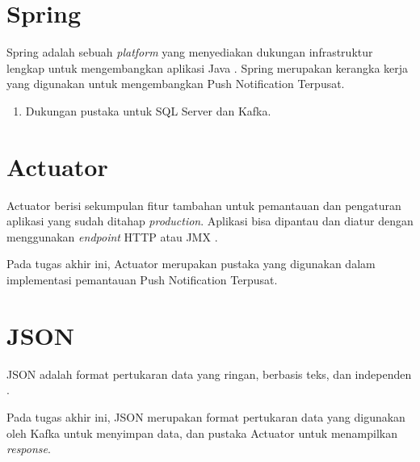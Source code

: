 \section{Spring}
\par Spring adalah sebuah \textit{platform} yang menyediakan dukungan infrastruktur lengkap untuk mengembangkan aplikasi Java \cite{spring-online}. Spring merupakan kerangka kerja yang digunakan untuk mengembangkan Push Notification Terpusat.
\begin{enumerate}
	\item Dukungan pustaka untuk SQL Server dan Kafka.
\end{enumerate}

\section{Actuator}
\par Actuator berisi sekumpulan fitur tambahan untuk pemantauan dan pengaturan aplikasi yang sudah ditahap \textit{production}. Aplikasi bisa dipantau dan diatur dengan menggunakan \textit{endpoint} HTTP atau JMX \cite{actuator-online}.
\par Pada tugas akhir ini, Actuator merupakan pustaka yang digunakan dalam implementasi pemantauan Push Notification Terpusat.

\section{JSON}
\par JSON adalah format pertukaran data yang ringan, berbasis teks, dan independen \cite{json-online}.
\par Pada tugas akhir ini, JSON merupakan format pertukaran data yang digunakan oleh Kafka untuk menyimpan data, dan pustaka Actuator untuk menampilkan \textit{response}.

